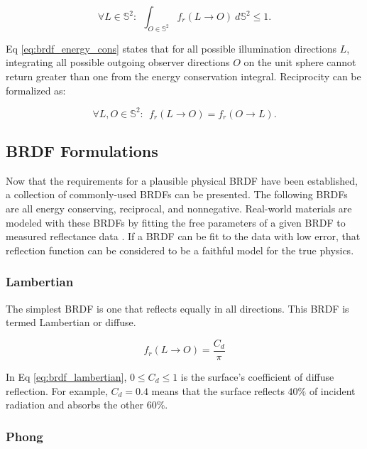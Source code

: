 \begin{equation} \label{eq:brdf_energy_cons}
  \forall L \in \mathbb{S}^2 : \:\: \int_{O \in \mathbb{S}^2} f_r(L \rightarrow O) \: d\mathbb{S}^2 \leq 1.
\end{equation}

Eq \ref{eq:brdf_energy_cons} states that for all possible illumination directions $L$, integrating all possible outgoing observer directions $O$ on the unit sphere cannot return greater than one from the energy conservation integral. Reciprocity can be formalized as:

\begin{equation} \label{eq:brdf_reciprocity}
  \forall L, O \in \mathbb{S}^2 : \:\: f_r(L \rightarrow O) = f_r(O \rightarrow L).
\end{equation}

\subsection{BRDF Formulations}

Now that the requirements for a plausible physical BRDF have been established, a collection of commonly-used BRDFs can be presented. The following BRDFs are all energy conserving, reciprocal, and nonnegative. Real-world materials are modeled with these BRDFs by fitting the free parameters of a given BRDF to measured reflectance data \cite{matusik2003}. If a BRDF can be fit to the data with low error, that reflection function can be considered to be a faithful model for the true physics. 

\subsubsection{Lambertian}

The simplest BRDF is one that reflects equally in all directions. This BRDF is termed Lambertian or diffuse.

\begin{equation} \label{eq:brdf_lambertian}
  f_r(L \rightarrow O) = \frac{C_d}{\pi}
\end{equation}

In Eq \ref{eq:brdf_lambertian}, $0 \leq C_d \leq 1$ is the surface's coefficient of diffuse reflection. For example, $C_d = 0.4$ means that the surface reflects $40\%$ of incident radiation and absorbs the other $60\%$. 

\subsubsection{Phong}

